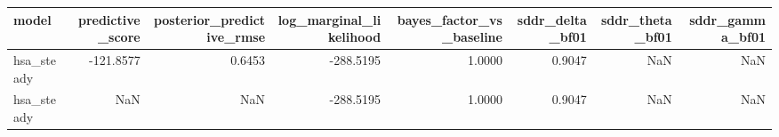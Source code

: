 \begin{tabular}{lrrrrrrr}
\toprule
model & predictive\_score & posterior\_predictive\_rmse & log\_marginal\_likelihood & bayes\_factor\_vs\_baseline & sddr\_delta\_bf01 & sddr\_theta\_bf01 & sddr\_gamma\_bf01 \\
\midrule
hsa\_steady & -121.8577 & 0.6453 & -288.5195 & 1.0000 & 0.9047 & NaN & NaN \\
hsa\_steady & NaN & NaN & -288.5195 & 1.0000 & 0.9047 & NaN & NaN \\
\bottomrule
\end{tabular}
